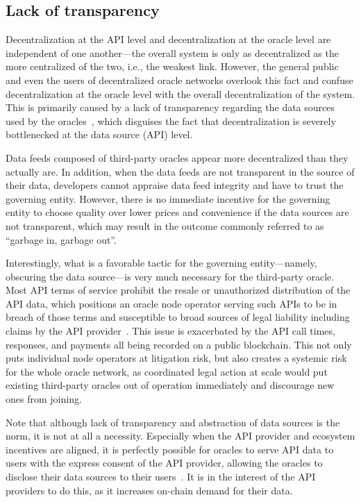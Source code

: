 \documentclass[11pt]{article}
\begin{document}
\subsection{Lack of transparency}
\label{sec:lack-of-transparency}

Decentralization at the API level and decentralization at the oracle level are independent of one another---the overall system is only as decentralized as the more centralized of the two, i.e., the weakest link.
However, the general public and even the users of decentralized oracle networks overlook this fact and confuse decentralization at the oracle level with the overall decentralization of the system.
This is primarily caused by a lack of transparency regarding the data sources used by the oracles~\cite{feeds.chain.link}, which disguises the fact that decentralization is severely bottlenecked at the data source (API) level.

Data feeds composed of third-party oracles appear more decentralized than they actually are.
In addition, when the data feeds are not transparent in the source of their data, developers cannot appraise data feed integrity and have to trust the governing entity.
However, there is no immediate incentive for the governing entity to choose quality over lower prices and convenience if the data sources are not transparent, which may result in the outcome commonly referred to as ``garbage in, garbage out''.

Interestingly, what is a favorable tactic for the governing entity---namely, obscuring the data source---is very much necessary for the third-party oracle.
Most API terms of service prohibit the resale or unauthorized distribution of the API data, which positions an oracle node operator serving such APIs to be in breach of those terms and susceptible to broad sources of legal liability including claims by the API provider~\cite{data-licensing}.
This issue is exacerbated by the API call times, responses, and payments all being recorded on a public blockchain.
This not only puts individual node operators at litigation risk, but also creates a systemic risk for the whole oracle network, as coordinated legal action at scale would put existing third-party oracles out of operation immediately and discourage new ones from joining.

Note that although lack of transparency and abstraction of data sources is the norm, it is not at  all a necessity.
Especially when the API provider and ecosystem incentives are aligned, it is perfectly possible for oracles to serve API data to users with the express consent of the API provider, allowing the oracles to disclose their data sources to their users~\cite{honeycomb.market}.
It is in the interest of the API providers to do this, as it increases on-chain demand for their data.
\end{document}
